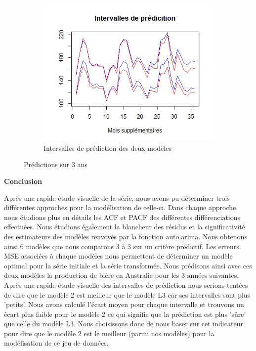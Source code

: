 \documentclass[12pt,a4paper]{book}
\newcommand{\1}{\mathds{1}}
\begin{document}
\begin{figure}[h!]
    \centering
    \begin{subfigure}{.5\textwidth}
    	\centering
    	\includegraphics[width=\textwidth]{int_pred}  
    	\caption{Intervalles de prédiction des deux modèles}
    	\label{fig:sub2}
    \end{subfigure}

\caption{Prédictions sur 3 ans}
\end{figure}


\newpage

\noindent
{\LARGE \textbf{Conclusion}}

\vspace{5 mm}
Après une rapide étude visuelle de la série, nous avons pu déterminer trois différentes approches pour la modélisation de celle-ci. Dans chaque approche, nous étudions plus en détails les ACF et PACF des différentes différenciations effectuées. Nous étudions également la blancheur des résidus et la significativité des estimateurs des modèles renvoyés par la fonction auto.arima. Nous obtenons ainsi 6 modèles que nous comparons 3 à 3 sur un critère prédictif. Les erreurs MSE associées à chaque modèles nous permettent de déterminer un modèle optimal pour la série initiale et la série transformée. Nous prédisons ainsi avec ces deux modèles la production de bière en Australie pour les 3 années suivantes. 
Après une rapide étude visuelle des intervalles de prédiction nous serions tentées de dire que le modèle 2 est meilleur que le modèle L3 car ses intervalles sont plus 'petits'. Nous avons calculé l'écart moyen pour chaque intervalle et trouvons un écart plus faible pour le modèle 2 ce qui signifie que la prédiction est plus 'sûre' que celle du modèle L3. Nous choisissons donc de nous baser sur cet indicateur pour dire que le modèle 2 est le meilleur (parmi nos modèles) pour la modélisation de ce jeu de données.
\end{document}
